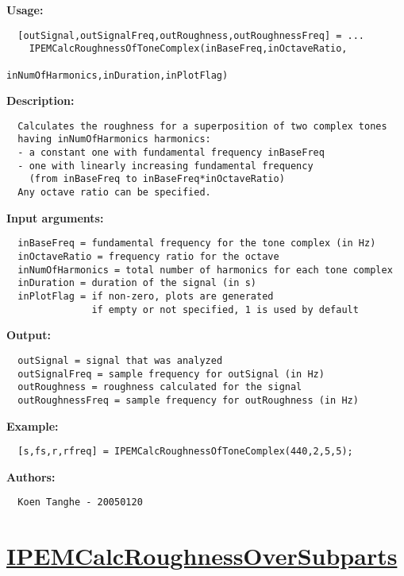 \textbf{Usage:}
\begin{verbatim}  [outSignal,outSignalFreq,outRoughness,outRoughnessFreq] = ...
    IPEMCalcRoughnessOfToneComplex(inBaseFreq,inOctaveRatio,
                                   inNumOfHarmonics,inDuration,inPlotFlag)

\end{verbatim}
\textbf{Description:}
\begin{verbatim}  Calculates the roughness for a superposition of two complex tones
  having inNumOfHarmonics harmonics:
  - a constant one with fundamental frequency inBaseFreq
  - one with linearly increasing fundamental frequency
    (from inBaseFreq to inBaseFreq*inOctaveRatio)
  Any octave ratio can be specified.

\end{verbatim}
\textbf{Input arguments:}
\begin{verbatim}  inBaseFreq = fundamental frequency for the tone complex (in Hz)
  inOctaveRatio = frequency ratio for the octave
  inNumOfHarmonics = total number of harmonics for each tone complex
  inDuration = duration of the signal (in s)
  inPlotFlag = if non-zero, plots are generated
               if empty or not specified, 1 is used by default

\end{verbatim}
\textbf{Output:}
\begin{verbatim}  outSignal = signal that was analyzed
  outSignalFreq = sample frequency for outSignal (in Hz)
  outRoughness = roughness calculated for the signal
  outRoughnessFreq = sample frequency for outRoughness (in Hz)

\end{verbatim}
\textbf{Example:}
\begin{verbatim}  [s,fs,r,rfreq] = IPEMCalcRoughnessOfToneComplex(440,2,5,5);

\end{verbatim}
\textbf{Authors:}
\begin{verbatim}  Koen Tanghe - 20050120
\end{verbatim}


\newpage
\section*{\hyperlink{Concepts:IPEMCalcRoughnessOverSubparts}{IPEMCalcRoughnessOverSubparts}}
\hypertarget{FuncRef:IPEMCalcRoughnessOverSubparts}{}


